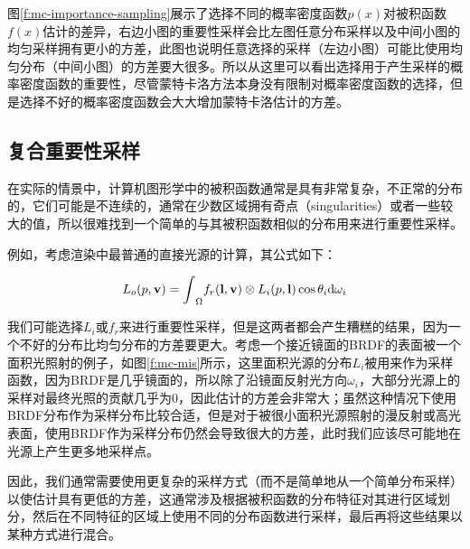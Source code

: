 图\ref{f:mc-importance-sampling}展示了选择不同的概率密度函数$p(x)$对被积函数$f(x)$估计的差异，右边小图的重要性采样会比左图任意分布采样以及中间小图的均匀采样拥有更小的方差，此图也说明任意选择的采样（左边小图）可能比使用均匀分布（中间小图）的方差要大很多。所以从这里可以看出选择用于产生采样的概率密度函数的重要性，尽管蒙特卡洛方法本身没有限制对概率密度函数的选择，但是选择不好的概率密度函数会大大增加蒙特卡洛估计的方差。





\subsection{复合重要性采样}\label{sec:mc-mis}
在实际的情景中，计算机图形学中的被积函数通常是具有非常复杂，不正常的分布的，它们可能是不连续的，通常在少数区域拥有奇点（singularities）或者一些较大的值，所以很难找到一个简单的与其被积函数相似的分布用来进行重要性采样。

例如，考虑渲染中最普通的直接光源的计算，其公式如下：

\begin{equation}
	L_o({p},\mathbf{v})={\rm \int}_{\Omega}f_r(\mathbf{l},\mathbf{v})\otimes L_i({p},\mathbf{l})\cos\theta_i {\rm d}\omega_i
\end{equation}

我们可能选择$L_i$或$f_r$来进行重要性采样，但是这两者都会产生糟糕的结果，因为一个不好的分布比均匀分布的方差要更大。考虑一个接近镜面的BRDF的表面被一个面积光照射的例子，如图\ref{f:mc-mis}所示，这里面积光源的分布$L_i$被用来作为采样函数，因为BRDF是几乎镜面的，所以除了沿镜面反射光方向$\omega_i$，大部分光源上的采样对最终光照的贡献几乎为0，因此估计的方差会非常大；虽然这种情况下使用BRDF分布作为采样分布比较合适，但是对于被很小面积光源照射的漫反射或高光表面，使用BRDF作为采样分布仍然会导致很大的方差，此时我们应该尽可能地在光源上产生更多地采样点。

因此，我们通常需要使用更复杂的采样方式（而不是简单地从一个简单分布采样）以使估计具有更低的方差，这通常涉及根据被积函数的分布特征对其进行区域划分，然后在不同特征的区域上使用不同的分布函数进行采样，最后再将这些结果以某种方式进行混合。

